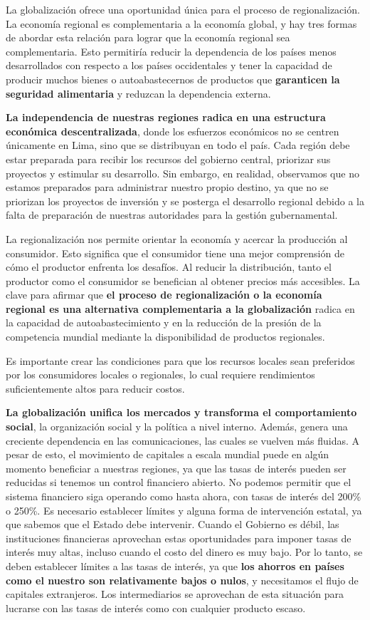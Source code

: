 \documentclass[
  letterpaper,
  DIV=11,
  numbers=noendperiod]{scrartcl}
\begin{document}
La globalización ofrece una oportunidad única para el proceso de
regionalización. La economía regional es complementaria a la economía
global, y hay tres formas de abordar esta relación para lograr que la
economía regional sea complementaria. Esto permitiría reducir la
dependencia de los países menos desarrollados con respecto a los países
occidentales y tener la capacidad de producir muchos bienes o
autoabastecernos de productos que \textbf{garanticen la seguridad
alimentaria} y reduzcan la dependencia externa.

\textbf{La independencia de nuestras regiones radica en una estructura
económica descentralizada}, donde los esfuerzos económicos no se centren
únicamente en Lima, sino que se distribuyan en todo el país. Cada región
debe estar preparada para recibir los recursos del gobierno central,
priorizar sus proyectos y estimular su desarrollo. Sin embargo, en
realidad, observamos que no estamos preparados para administrar nuestro
propio destino, ya que no se priorizan los proyectos de inversión y se
posterga el desarrollo regional debido a la falta de preparación de
nuestras autoridades para la gestión gubernamental.

La regionalización nos permite orientar la economía y acercar la
producción al consumidor. Esto significa que el consumidor tiene una
mejor comprensión de cómo el productor enfrenta los desafíos. Al reducir
la distribución, tanto el productor como el consumidor se benefician al
obtener precios más accesibles. La clave para afirmar que \textbf{el
proceso de regionalización o la economía regional es una alternativa
complementaria a la globalización} radica en la capacidad de
autoabastecimiento y en la reducción de la presión de la competencia
mundial mediante la disponibilidad de productos regionales.

Es importante crear las condiciones para que los recursos locales sean
preferidos por los consumidores locales o regionales, lo cual requiere
rendimientos suficientemente altos para reducir costos.

\textbf{La globalización unifica los mercados y transforma el
comportamiento social}, la organización social y la política a nivel
interno. Además, genera una creciente dependencia en las comunicaciones,
las cuales se vuelven más fluidas. A pesar de esto, el movimiento de
capitales a escala mundial puede en algún momento beneficiar a nuestras
regiones, ya que las tasas de interés pueden ser reducidas si tenemos un
control financiero abierto. No podemos permitir que el sistema
financiero siga operando como hasta ahora, con tasas de interés del
200\% o 250\%. Es necesario establecer límites y alguna forma de
intervención estatal, ya que sabemos que el Estado debe intervenir.
Cuando el Gobierno es débil, las instituciones financieras aprovechan
estas oportunidades para imponer tasas de interés muy altas, incluso
cuando el costo del dinero es muy bajo. Por lo tanto, se deben
establecer límites a las tasas de interés, ya que \textbf{los ahorros en
países como el nuestro son relativamente bajos o nulos}, y necesitamos
el flujo de capitales extranjeros. Los intermediarios se aprovechan de
esta situación para lucrarse con las tasas de interés como con cualquier
producto escaso.
\end{document}
